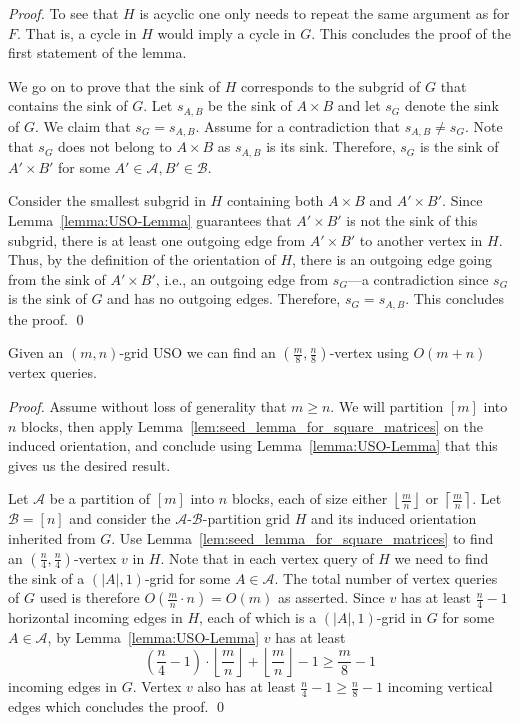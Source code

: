 \documentclass[runningheads,a4paper]{llncs}
\newcommand{\A}{\ensuremath{\mathcal A}}
\newcommand{\B}{\ensuremath{\mathcal B}}
\newcommand{\s}[1]{\ensuremath{s_{\scriptscriptstyle#1}}}
\begin{document}
\begin{proof}
To see that $H$ is acyclic one only needs to repeat the same argument as for $F$. That is, a cycle in $H$ would imply a cycle in $G$. This concludes the proof of the first statement of the lemma.


We go on to prove that the sink of $H$ corresponds to the subgrid of $G$ that contains the sink of $G$.
Let $\s{A,B}$ be the sink of $A\times B$ and let $\s{G}$ denote the sink of $G$.
We claim that $\s{G} = \s{A,B}$.
Assume for a contradiction that $\s{A,B}\neq \s{G}$.
Note that $\s{G}$ does not belong to $A\times B$ as $\s{A,B}$ is its sink.
Therefore, $\s{G}$ is the sink of $A'\times B'$ for some $A'\in \A, B'\in \B$.

Consider the smallest subgrid in $H$ containing both $A\times B$ and $A'\times B'$. 
Since Lemma~\ref{lemma:USO-Lemma} guarantees that $A'\times B'$ is not the sink of this subgrid, there is at least one outgoing edge from $A'\times B'$ to another vertex in $H$.
Thus, by the definition of the orientation of $H$, there is an outgoing edge going from the sink of $A'\times B'$, i.e., an outgoing edge from $\s{G}$---a contradiction since $\s{G}$ is the sink of $G$ and has no outgoing edges. 
Therefore, $\s{G} = \s{A,B}$. 
This concludes the proof. \qed

\end{proof}

\setcounter{corollary}{0}
\begin{corollary}
  Given an $(m, n)$-grid USO we can find an $(\frac{m}{8}, \frac{n}{8})$-vertex using $O(m+n)$ vertex queries.
\end{corollary} 
\begin{proof}
 Assume without loss of generality that $m \geq n$. 
 We will partition $[m]$ into $n$ blocks, then apply Lemma~\ref{lem:seed_lemma_for_square_matrices} on the induced orientation, and conclude using
 Lemma~\ref{lemma:USO-Lemma} that this  gives us the desired result.
 
  Let $\A$ be a partition of $[m]$ into $n$ blocks, each of size either $\left\lfloor \frac{m}{n} \right\rfloor$ or $\left\lceil \frac{m}{n} \right\rceil$. Let $\B = [n]$ and 
consider the $\A$-$\B$-partition grid $H$ and its induced orientation inherited from $G$. 
 Use Lemma~\ref{lem:seed_lemma_for_square_matrices} to find an $(\frac{n}{4}, \frac{n}{4})$-vertex $v$ in $H$. 
 Note that in each vertex query of $H$ we need to find the sink of a $(|A|,1)$-grid for some $A\in \A$. 
 The total number of vertex queries of $G$ used is therefore $O(\frac{m}{n}\cdot n) = O(m)$ as asserted. 
 Since $v$ has at least $\frac{n}{4} - 1$ horizontal incoming edges in $H$, each of which is a $(|A|,1)$-grid in $G$ for some $A\in \A$, 
 by Lemma~\ref{lemma:USO-Lemma} $v$ has at least $$\left(\frac{n}{4} - 1\right)\cdot\left\lfloor \frac{m}{n} \right\rfloor + \left\lfloor \frac{m}{n} \right\rfloor - 1 \geq \frac{m}{8} - 1$$ incoming edges in $G$.
 Vertex $v$ also has at least $\frac{n}{4} - 1 \geq \frac{n}{8} - 1$ incoming vertical edges which concludes the proof. \qed
\end{proof}
\end{document}
